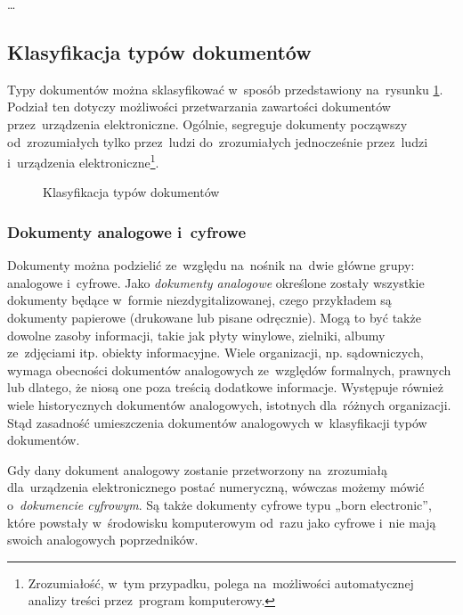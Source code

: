 \dots



\subsection{Klasyfikacja typów dokumentów}
\label{sec:KlasyfikacjaTypowDokumentow}

Typy dokumentów można sklasyfikować w~sposób przedstawiony na~rysunku \ref{fig:docFormatsPL}. Podział ten dotyczy możliwości przetwarzania zawartości dokumentów przez~urządzenia elektroniczne. Ogólnie, segreguje dokumenty począwszy od~zrozumiałych tylko przez~ludzi do~zrozumiałych jednocześnie przez~ludzi i~urządzenia elektroniczne\footnote{Zrozumiałość, w~tym przypadku, polega na~możliwości automatycznej analizy treści przez~program komputerowy.}. 

\begin{figure}[htbp]
 	  \resizebox{.88\textwidth}{!}{}
	\caption{Klasyfikacja typów dokumentów}
	\label{fig:docFormatsPL}
\end{figure}

\subsubsection{Dokumenty analogowe i~cyfrowe}
\label{sec:DokumentyAnalogoweICyfrowe}

Dokumenty można podzielić ze~względu na~nośnik na~dwie główne grupy: analogowe i~cyfrowe. Jako \emph{dokumenty analogowe} określone zostały wszystkie dokumenty będące w~formie niezdygitalizowanej, czego przykładem są dokumenty papierowe (drukowane lub pisane odręcznie). Mogą to być także dowolne zasoby informacji, takie jak płyty winylowe, zielniki, albumy ze~zdjęciami itp. obiekty informacyjne. Wiele organizacji, np. sądowniczych, wymaga obecności dokumentów analogowych ze~względów formalnych, prawnych lub dlatego, że niosą one poza treścią dodatkowe informacje. Występuje również wiele historycznych dokumentów analogowych, istotnych dla~różnych organizacji. Stąd zasadność umieszczenia dokumentów analogowych w~klasyfikacji typów dokumentów.

Gdy dany dokument analogowy zostanie przetworzony na~zrozumiałą dla~urządzenia elektronicznego postać numeryczną, wówczas możemy mówić o~\emph{dokumencie cyfrowym}. Są także dokumenty cyfrowe typu „born electronic”, które powstały w~środowisku komputerowym od~razu jako cyfrowe i~nie mają swoich analogowych poprzedników.

